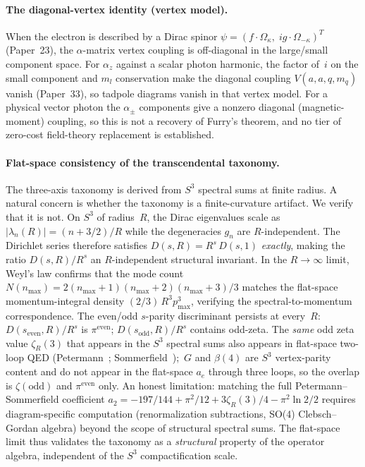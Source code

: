 \documentclass[aps,pra,twocolumn,superscriptaddress,longbibliography]{revtex4-2}
\begin{document}
\paragraph{The diagonal-vertex identity (vertex model).}
When the electron is described by a Dirac spinor
$\psi = (f \cdot \Omega_\kappa,\; i g \cdot \Omega_{-\kappa})^T$
(Paper~23), the $\alpha$-matrix vertex coupling is off-diagonal in the
large/small component space.  For $\alpha_z$ against a scalar photon
harmonic, the factor of~$i$ on the small component and $m_l$
conservation make the diagonal coupling $V(a,a,q,m_q)$ vanish
(Paper~33), so tadpole diagrams vanish in that vertex model.  For a
physical vector photon the $\alpha_\pm$ components give a nonzero
diagonal (magnetic-moment) coupling, so this is not a recovery of
Furry's theorem, and no tier of zero-cost field-theory replacement is
established.

\paragraph{Flat-space consistency of the transcendental taxonomy.}
The three-axis taxonomy is derived from $S^3$ spectral sums at finite
radius.  A natural concern is whether the taxonomy is a
finite-curvature artifact.  We verify that it is not.
On $S^3$ of radius~$R$, the Dirac eigenvalues scale as
$|\lambda_n(R)| = (n + 3/2)/R$ while the degeneracies $g_n$ are
$R$-independent.  The Dirichlet series therefore satisfies
$D(s,R) = R^s\,D(s,1)$ \emph{exactly}, making the ratio
$D(s,R)/R^s$ an $R$-independent structural invariant.  In the
$R \to \infty$ limit, Weyl's law confirms that the mode count
$N(n_{\max}) = 2(n_{\max}+1)(n_{\max}+2)(n_{\max}+3)/3$
matches the flat-space momentum-integral density
$(2/3)\,R^3 p_{\max}^3$, verifying the spectral-to-momentum
correspondence.  The even/odd $s$-parity discriminant persists at
every~$R$: $D(s_{\text{even}},R)/R^s$ is $\pi^{\text{even}}$;
$D(s_{\text{odd}},R)/R^s$ contains odd-zeta.  The \emph{same}
odd zeta value $\zeta_R(3)$ that appears in the $S^3$ spectral sums
also appears in flat-space two-loop QED (Petermann~\cite{petermann1957};
Sommerfield~\cite{sommerfield1957});\ $G$ and $\beta(4)$ are $S^3$
vertex-parity content and do not appear in the flat-space $a_e$ through
three loops, so the overlap is $\zeta(\mathrm{odd})$ and
$\pi^{\mathrm{even}}$ only.
An honest limitation: matching the full Petermann--Sommerfield
coefficient $a_2 = -197/144 + \pi^2/12 + 3\zeta_R(3)/4
- \pi^2 \ln 2 / 2$ requires diagram-specific computation
(renormalization subtractions, SO(4) Clebsch--Gordan algebra)
beyond the scope of structural spectral sums.
The flat-space limit thus validates the taxonomy as a
\emph{structural} property of the operator algebra, independent
of the $S^3$ compactification scale.
\end{document}
